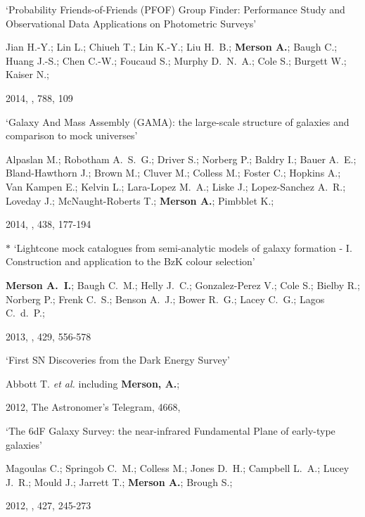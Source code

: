 \begin{etaremune}[leftmargin=15pt]
\item \label{itm:Jian2014} `Probability Friends-of-Friends (PFOF) Group Finder: Performance Study and Observational Data Applications on Photometric Surveys'\newline
  \begin{small}Jian H.-Y.; Lin L.; Chiueh T.; Lin K.-Y.; Liu H.~B.; \textbf{Merson A.}; Baugh C.; Huang J.-S.; Chen C.-W.; Foucaud S.; Murphy D.~N.~A.; Cole S.; Burgett W.; Kaiser N.;\end{small} 2014, \apj, 788, 109

\item \label{itm:Alpaslan2014} `Galaxy And Mass Assembly (GAMA): the large-scale structure of galaxies and comparison to mock universes'\newline
  \begin{small}Alpaslan M.; Robotham A.~S.~G.; Driver S.; Norberg P.; Baldry I.; Bauer A.~E.; Bland-Hawthorn J.; Brown M.; Cluver M.; Colless M.; Foster C.; Hopkins A.; Van Kampen E.; Kelvin L.; Lara-Lopez M.~A.; Liske J.; Lopez-Sanchez A.~R.; Loveday J.; McNaught-Roberts T.; \textbf{Merson A.}; Pimbblet K.;\end{small} 2014, \mnras, 438, 177-194

\item \label{itm:Merson2013}{\Large $\ast$} `Lightcone mock catalogues from semi-analytic models of galaxy formation - I. Construction and application to the BzK colour selection'\newline
  \begin{small}\textbf{Merson A.~I.}; Baugh C.~M.; Helly J.~C.; Gonzalez-Perez V.; Cole S.; Bielby R.; Norberg P.; Frenk C.~S.; Benson A.~J.; Bower R.~G.; Lacey C.~G.; Lagos C.~d.~P.;\end{small} 2013, \mnras, 429, 556-578

\item \label{itm:Abbott2012} `First SN Discoveries from the Dark Energy Survey'\newline
  \begin{small}Abbott T. \textit{et al.} including \textbf{Merson, A.};\end{small} 2012, The Astronomer's Telegram, 4668,

\item \label{itm:Magoulas2012} `The 6dF Galaxy Survey: the near-infrared Fundamental Plane of early-type galaxies'\newline
  \begin{small}Magoulas C.; Springob C.~M.; Colless M.; Jones D.~H.; Campbell L.~A.; Lucey J.~R.; Mould J.; Jarrett T.; \textbf{Merson A.}; Brough S.;\end{small} 2012, \mnras, 427, 245-273


\end{etaremune}
